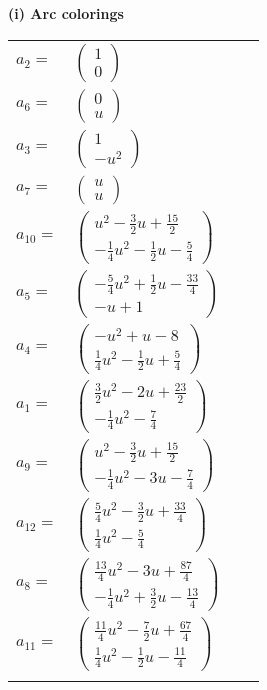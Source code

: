 \documentclass[1p]{elsarticle_modified}
\theoremstyle{definition}
\begin{document}
\flushleft \textbf{(i) Arc colorings}\\
\begin{tabular}{m{7pt} m{180pt} m{7pt} m{180pt} }
\flushright $a_{2}=$&$\begin{pmatrix}1\\0\end{pmatrix}$ \\
\flushright $a_{6}=$&$\begin{pmatrix}0\\u\end{pmatrix}$ \\
\flushright $a_{3}=$&$\begin{pmatrix}1\\- u^2\end{pmatrix}$ \\
\flushright $a_{7}=$&$\begin{pmatrix}u\\u\end{pmatrix}$ \\
\flushright $a_{10}=$&$\begin{pmatrix}u^2-\frac{3}{2} u+\frac{15}{2}\\-\frac{1}{4} u^2-\frac{1}{2} u-\frac{5}{4}\end{pmatrix}$ \\
\flushright $a_{5}=$&$\begin{pmatrix}-\frac{5}{4} u^2+\frac{1}{2} u-\frac{33}{4}\\- u+1\end{pmatrix}$ \\
\flushright $a_{4}=$&$\begin{pmatrix}- u^2+u-8\\\frac{1}{4} u^2-\frac{1}{2} u+\frac{5}{4}\end{pmatrix}$ \\
\flushright $a_{1}=$&$\begin{pmatrix}\frac{3}{2} u^2-2 u+\frac{23}{2}\\-\frac{1}{4} u^2-\frac{7}{4}\end{pmatrix}$ \\
\flushright $a_{9}=$&$\begin{pmatrix}u^2-\frac{3}{2} u+\frac{15}{2}\\-\frac{1}{4} u^2-3 u-\frac{7}{4}\end{pmatrix}$ \\
\flushright $a_{12}=$&$\begin{pmatrix}\frac{5}{4} u^2-\frac{3}{2} u+\frac{33}{4}\\\frac{1}{4} u^2-\frac{5}{4}\end{pmatrix}$ \\
\flushright $a_{8}=$&$\begin{pmatrix}\frac{13}{4} u^2-3 u+\frac{87}{4}\\-\frac{1}{4} u^2+\frac{3}{2} u-\frac{13}{4}\end{pmatrix}$ \\
\flushright $a_{11}=$&$\begin{pmatrix}\frac{11}{4} u^2-\frac{7}{2} u+\frac{67}{4}\\\frac{1}{4} u^2-\frac{1}{2} u-\frac{11}{4}\end{pmatrix}$\\&\end{tabular}
\end{document}
